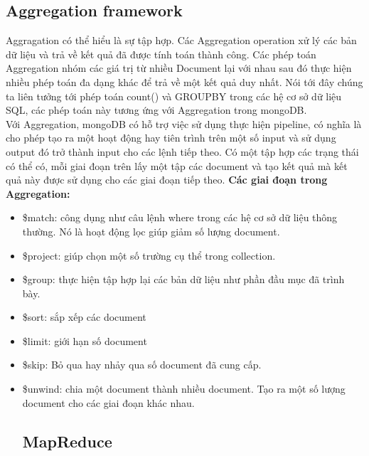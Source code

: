 \subsection{Aggregation framework}
Aggragation có thể hiểu là sự tập hợp. Các Aggregation operation xử lý các bản dữ liệu và trả về kết quả đã được tính toán thành công. Các phép toán Aggregation nhóm các giá trị từ nhiều Document lại với nhau sau đó thực hiện nhiều phép toán đa dạng khác để trả về một kết quả duy nhất. Nói tới đây chúng ta liên tưởng tới phép toán count() và GROUPBY trong các hệ cơ sở dữ liệu SQL, các phép toán này tương ứng với Aggregation trong mongoDB.\\
Với Aggregation, mongoDB có hỗ trợ việc sử dụng thực hiện pipeline, có nghĩa là cho phép tạo ra một hoạt động hay tiên trình trên một số input và sử dụng output đó trở thành input cho các lệnh tiếp theo. Có một tập hợp các trạng thái có thể có, mỗi giai đoạn trên lấy một tập các document và tạo kết quả mà kết quả này được sử dụng cho các giai đoạn tiếp theo.
\textbf{Các giai đoạn trong Aggregation:}
\begin{itemize}
	\item \$match: công dụng như câu lệnh where trong các hệ cơ sở dữ liệu thông thường. Nó là hoạt động lọc giúp giảm số lượng document.
	\item \$project: giúp chọn một số trường cụ thể trong collection.
	\item \$group: thực hiện tập hợp lại các bản dữ liệu như phần đầu mục đã trình bày.
	\item \$sort: sắp xếp các document
	\item \$limit: giới hạn số document
	\item \$skip: Bỏ qua hay nhảy qua số document đã cung cấp.
	\item \$unwind: chia một document thành nhiều document. Tạo ra một số lượng document cho các giai đoạn khác nhau.
\subsection{MapReduce}	
\end{itemize}
